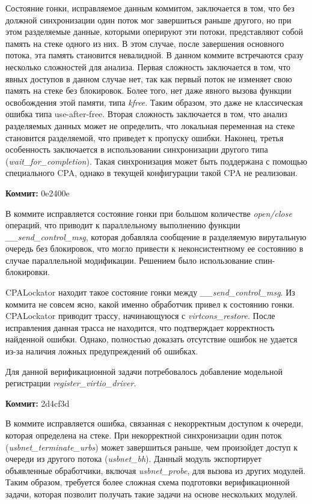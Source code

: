 Состояние гонки, исправляемое данным коммитом, заключается в том, что без должной синхронизации один поток мог завершиться раньше другого, но при этом разделяемые данные, которыми оперируют эти потоки, представляют собой память на стеке одного из них.
В этом случае, после завершения основного потока, эта память становится невалидной. 
В данном коммите встречаются сразу несколько сложностей для анализа.
Первая сложность заключается в том, что явных доступов в данном случае нет, так как первый поток не изменяет свою память на стеке без блокировок.
Более того, нет даже явного вызова функции освобождения этой памяти, типа \textit{kfree}.
Таким образом, это даже не классическая ошибка типа use-after-free.
Вторая сложность заключается в том, что анализ разделяемых данных может не определить, что локальная переменная на стеке становится разделяемой, что приведет к пропуску ошибки.
Наконец, третья особенность заключается в использовании синхронизации другого типа (\textit{wait\_for\_completion}).
Такая синхронизация может быть поддержана с помощью специального CPA, однако в текущей конфигурации такой CPA не реализован.

\vspace{1cm}

\textbf{Коммит:} 0e2400e

В коммите исправляется состояние гонки при большом количестве \textit{open/close} операций, что приводит к параллельному выполнению функции \textit{\_\_send\_control\_msg}, которая добавляла сообщение в разделяемую вирутальную очередь без блокировок, что могло привести к неконсистентному ее состоянию в случае параллельной модификации.
Решением было использование спин-блокировки.

CPALockator находит такое состояние гонки между \textit{\_\_send\_control\_msg}.
Из коммита не совсем ясно, какой именно обработчик привел к состоянию гонки. 
CPALockator приводит трассу, начинающуюся с \textit{virtcons\_restore}. 
После исправления данная трасса не находится, что подтверждает корректность найденной ошибки.
Однако, полностью доказать отсутствие ошибок не удается из-за наличия ложных предупреждений об ошибках.

Для данной верификационной задачи потребовалось добавление модельной регистрации \textit{register\_virtio\_driver}.

\vspace{1cm}

\textbf{Коммит:} 2d4cf3d

В коммите исправляется ошибка, связанная с некорректным доступом к очереди, которая определена на стеке.
При некорректной синхронизации один поток (\textit{usbnet\_terminate\_urbs}) может завершиться раньше, чем произойдет доступ к очереди из другого потока (\textit{usbnet\_bh}).
Данный модуль экспортирует объявленные обработчики, включая \textit{usbnet\_probe}, для вызова из других модулей. 
Таким образом, требуется более сложная схема подготовки верификационной задачи, которая позволит получать такие задачи на основе нескольких модулей.

